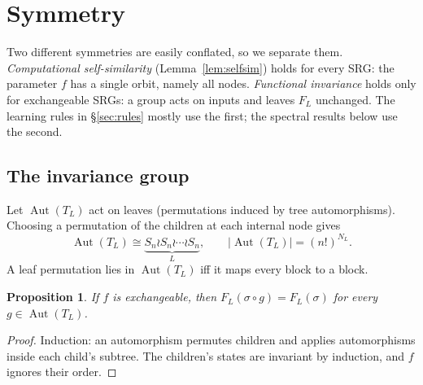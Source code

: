 \documentclass[11pt]{article}
\newtheorem{proposition}[theorem]{Proposition}
\theoremstyle{definition}
\newcommand{\Aut}{\operatorname{Aut}}
\newcommand{\Nint}{N_{L}}
\begin{document}
\section{Symmetry}\label{sec:sym}
Two different symmetries are easily conflated, so we separate them.
\emph{Computational self-similarity} (Lemma~\ref{lem:selfsim}) holds for every SRG: the parameter
$f$ has a single orbit, namely all nodes. \emph{Functional invariance} holds only for exchangeable
SRGs: a group acts on inputs and leaves $F_L$ unchanged. The learning rules in
\S\ref{sec:rules} mostly use the first; the spectral results below use the second.

\subsection{The invariance group}
Let $\Aut(T_L)$ act on leaves (permutations induced by tree automorphisms). Choosing a
permutation of the children at each internal node gives
\[
\Aut(T_L)\cong \underbrace{S_n\wr S_n\wr\cdots\wr S_n}_{L},\qquad |\Aut(T_L)|=(n!)^{\Nint}.
\]
A leaf permutation lies in $\Aut(T_L)$ iff it maps every block to a block.

\begin{proposition}\label{prop:inv}
If $f$ is exchangeable, then $F_L(\sigma\circ g)=F_L(\sigma)$ for every $g\in\Aut(T_L)$.
\end{proposition}
\begin{proof}Induction: an automorphism permutes children and applies automorphisms inside
each child's subtree. The children's states are invariant by induction, and $f$ ignores their
order.\end{proof}
\end{document}

